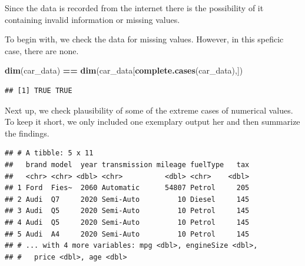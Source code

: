 \documentclass[sigchi]{acmart}
\newenvironment{Shaded}{\begin{snugshade}}{\end{snugshade}}
\newcommand{\CommentTok}[1]{\textcolor[rgb]{0.56,0.35,0.01}{\textit{#1}}}
\newcommand{\DataTypeTok}[1]{\textcolor[rgb]{0.13,0.29,0.53}{#1}}
\newcommand{\DecValTok}[1]{\textcolor[rgb]{0.00,0.00,0.81}{#1}}
\newcommand{\KeywordTok}[1]{\textcolor[rgb]{0.13,0.29,0.53}{\textbf{#1}}}
\newcommand{\NormalTok}[1]{#1}
\newcommand{\OperatorTok}[1]{\textcolor[rgb]{0.81,0.36,0.00}{\textbf{#1}}}
\newcommand{\StringTok}[1]{\textcolor[rgb]{0.31,0.60,0.02}{#1}}
\begin{document}
Since the data is recorded from the internet there is the possibility of it containing invalid information or missing values.

To begin with, we check the data for missing values. However, in this speficic case, there are none.

\begin{Shaded}
\begin{Highlighting}[]
\KeywordTok{dim}\NormalTok{(car_data) }\OperatorTok{==}\StringTok{ }
\StringTok{  }\KeywordTok{dim}\NormalTok{(car_data[}\KeywordTok{complete.cases}\NormalTok{(car_data),])}
\end{Highlighting}
\end{Shaded}

\begin{verbatim}
## [1] TRUE TRUE
\end{verbatim}

Next up, we check plausibility of some of the extreme cases of numerical values. To keep it short, we only included one exemplary output her and then summarize the findings.

\begin{Shaded}
\end{Shaded}

\begin{verbatim}
## # A tibble: 5 x 11
##   brand model  year transmission mileage fuelType   tax
##   <chr> <chr> <dbl> <chr>          <dbl> <chr>    <dbl>
## 1 Ford  Fies~  2060 Automatic      54807 Petrol     205
## 2 Audi  Q7     2020 Semi-Auto         10 Diesel     145
## 3 Audi  Q5     2020 Semi-Auto         10 Petrol     145
## 4 Audi  Q5     2020 Semi-Auto         10 Petrol     145
## 5 Audi  A4     2020 Semi-Auto         10 Petrol     145
## # ... with 4 more variables: mpg <dbl>, engineSize <dbl>,
## #   price <dbl>, age <dbl>
\end{verbatim}

\begin{Shaded}
\end{Shaded}
\end{document}
